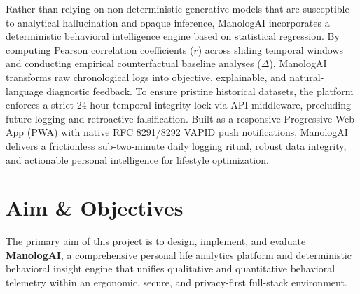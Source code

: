 Rather than relying on non-deterministic generative models that are susceptible to analytical hallucination and opaque inference, ManologAI incorporates a deterministic behavioral intelligence engine based on statistical regression. By computing Pearson correlation coefficients ($r$) across sliding temporal windows and conducting empirical counterfactual baseline analyses ($\Delta$), ManologAI transforms raw chronological logs into objective, explainable, and natural-language diagnostic feedback. To ensure pristine historical datasets, the platform enforces a strict 24-hour temporal integrity lock via API middleware, precluding future logging and retroactive falsification. Built as a responsive Progressive Web App (PWA) with native RFC 8291/8292 VAPID push notifications, ManologAI delivers a frictionless sub-two-minute daily logging ritual, robust data integrity, and actionable personal intelligence for lifestyle optimization.

\section{Aim \& Objectives}

The primary aim of this project is to design, implement, and evaluate \textbf{ManologAI}, a comprehensive personal life analytics platform and deterministic behavioral insight engine that unifies qualitative and quantitative behavioral telemetry within an ergonomic, secure, and privacy-first full-stack environment.

